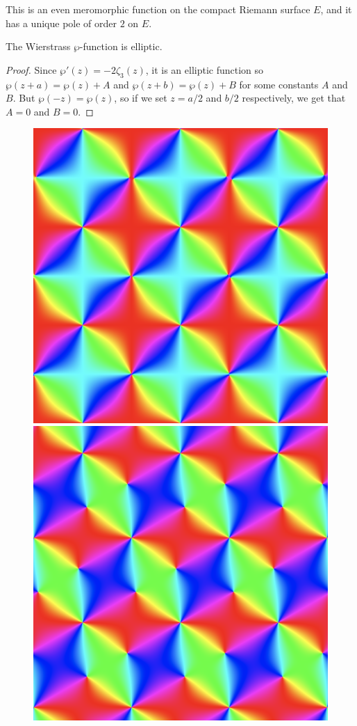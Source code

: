 \documentclass{lkx_paper}
\begin{document}
This is an even meromorphic function on the compact Riemann surface $E$, and it has a unique pole of order $2$ on $E$.

\begin{proposition}
	The Wierstrass $\wp$-function is elliptic.
\end{proposition}
\begin{proof}
	Since $\wp'(z)=-2\zeta_3(z)$, it is an elliptic function so $\wp(z+a)=\wp(z)+A$ and $\wp(z+b)=\wp(z)+B$ for some constants $A$ and $B$. But $\wp(-z)=\wp(z)$, so if we set $z=a/2$ and $b/2$ respectively, we get that $A=0$ and $B=0$.
\end{proof}

\begin{figure}[ht]
	\centering
	\includegraphics[scale=0.25]{pfunction_square.png}
	\hspace{0.5in}
	\includegraphics[scale=0.25]{pfunction_hex.png}

\end{figure}
\end{document}
